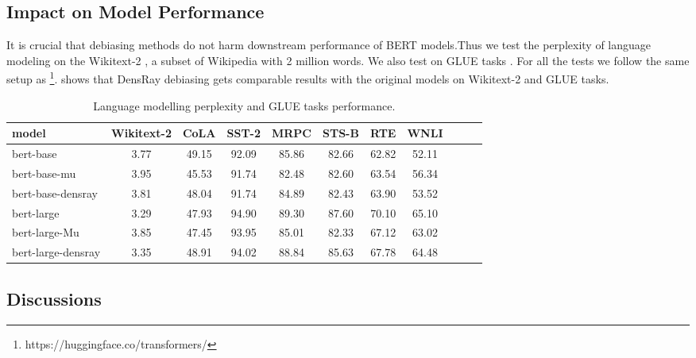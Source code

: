 \subsection{Impact on Model Performance}
It is crucial that debiasing methods do not harm downstream performance of BERT models.Thus we test the perplexity of language modeling on the Wikitext-2 \citep{merity2016pointer}, a subset of Wikipedia with 2 million words. We also test on GLUE tasks \citep{wang2018glue}. For all the tests we follow the same setup as \citet{wolf2019huggingfaces}\footnote{https://huggingface.co/transformers/}.  shows that DensRay debiasing gets comparable results with the original models on Wikitext-2 and GLUE tasks.
\begin{table}[ht]
\centering
\footnotesize
\begin{tabular}{lcccccccccc}
\hline
model & Wikitext-2&CoLA &SST-2&MRPC&STS-B&RTE&WNLI\\
\hline
bert-base &3.77&49.15&92.09&85.86&82.66&62.82&52.11\\
bert-base-mu &3.95&45.53&91.74&82.48&82.60&63.54&56.34\\
bert-base-densray &3.81&48.04&91.74&84.89&82.43&63.90&53.52\\
\hline
bert-large &3.29& 47.93&94.90&89.30&87.60&70.10&65.10\\
bert-large-Mu &3.85& 47.45&93.95&85.01&82.33&67.12&63.02\\
bert-large-densray &3.35& 48.91&94.02&88.84&85.63&67.78&64.48\\
\hline
\end{tabular}
\caption{
Language modelling perplexity and GLUE tasks performance. }
\end{table}
\subsection{Discussions}
